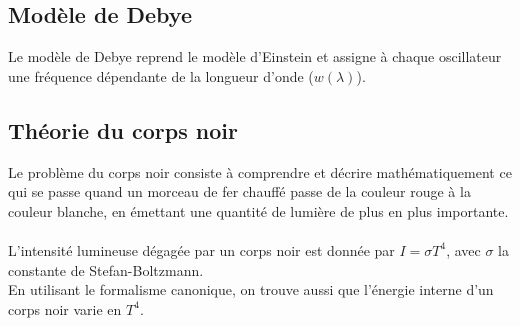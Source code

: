 \documentclass{article}
\begin{document}
    \subsection{Modèle de Debye}
        Le modèle de Debye reprend le modèle d'Einstein et assigne à chaque oscillateur une fréquence dépendante de la longueur d'onde ($w(\lambda)$).
    
    \subsection{Théorie du corps noir}
        Le problème du corps noir consiste à comprendre et
        décrire mathématiquement ce qui se passe quand un
        morceau de fer chauffé passe de la couleur rouge à
        la couleur blanche, en émettant une quantité de
        lumière de plus en plus importante.\\\\
        L'intensité lumineuse dégagée par un corps noir est donnée par $I = \sigma T^4$, avec $\sigma$ la constante de Stefan-Boltzmann.\\
        En utilisant le formalisme canonique, on trouve aussi que l'énergie interne d'un corps noir varie en $T^4$.
\end{document}
